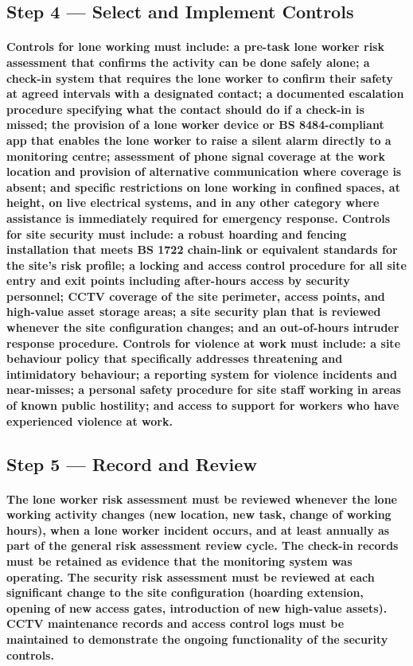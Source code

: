 \subsection{Step 4 --- Select and Implement Controls}
\paragraph{Controls for lone working must include: a pre-task lone worker risk assessment that confirms the activity can be done safely alone; a check-in system that requires the lone worker to confirm their safety at agreed intervals with a designated contact; a documented escalation procedure specifying what the contact should do if a check-in is missed; the provision of a lone worker device or BS 8484-compliant app that enables the lone worker to raise a silent alarm directly to a monitoring centre; assessment of phone signal coverage at the work location and provision of alternative communication where coverage is absent; and specific restrictions on lone working in confined spaces, at height, on live electrical systems, and in any other category where assistance is immediately required for emergency response. Controls for site security must include: a robust hoarding and fencing installation that meets BS 1722 chain-link or equivalent standards for the site's risk profile; a locking and access control procedure for all site entry and exit points including after-hours access by security personnel; CCTV coverage of the site perimeter, access points, and high-value asset storage areas; a site security plan that is reviewed whenever the site configuration changes; and an out-of-hours intruder response procedure. Controls for violence at work must include: a site behaviour policy that specifically addresses threatening and intimidatory behaviour; a reporting system for violence incidents and near-misses; a personal safety procedure for site staff working in areas of known public hostility; and access to support for workers who have experienced violence at work.}

\subsection{Step 5 --- Record and Review}
\paragraph{The lone worker risk assessment must be reviewed whenever the lone working activity changes (new location, new task, change of working hours), when a lone worker incident occurs, and at least annually as part of the general risk assessment review cycle. The check-in records must be retained as evidence that the monitoring system was operating. The security risk assessment must be reviewed at each significant change to the site configuration (hoarding extension, opening of new access gates, introduction of new high-value assets). CCTV maintenance records and access control logs must be maintained to demonstrate the ongoing functionality of the security controls.}

